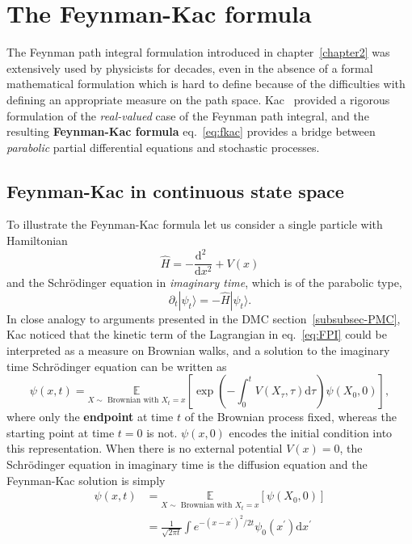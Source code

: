 \section{The Feynman-Kac formula}
\label{subsec:fk-fk}
The Feynman path integral formulation introduced in chapter~\ref{chapter2} was extensively used by physicists for decades, even in the absence of a formal mathematical formulation which is hard to define because of the difficulties with defining an appropriate measure on the path space. Kac~\cite{kac1949distributions} provided a rigorous formulation of the \textit{real-valued} case of the Feynman path integral, and the resulting \textbf{Feynman-Kac formula} eq.~\eqref{eq:fkac} provides a bridge between \emph{parabolic} partial differential equations and stochastic processes. 

\subsection{Feynman-Kac in continuous state space}
\label{subsec:FK_in_continuous_space}
To illustrate the Feynman-Kac formula let us consider a single particle with Hamiltonian
\begin{equation}
	\hat{H} = -\frac{\mathrm{d}^2~~}{\mathrm{d}x^2} + V(x)
\end{equation}
and the Schr\" odinger equation in \textit{imaginary time}, which is of the parabolic type, 
\begin{equation}
	\label{eq:imag_sch}
	\partial_t | \psi_t \rangle = - \hat{H} | \psi_t \rangle.
\end{equation}
In close analogy to arguments presented in the DMC section~\ref{subsubsec-PMC}, Kac noticed that the kinetic term of the Lagrangian in eq.~\eqref{eq:FPI} could be interpreted as a measure on Brownian walks, and a solution to the imaginary time Schr\" odinger equation can be written as
\begin{equation}
	\label{eq:fkac}
	\psi(x, t)=\underset{X \sim \text { Brownian with } X_{t}=x}{\mathbb{E}}
	\left[\exp \left(-\int_{0}^{t}  V\left(X_{\tau}, \tau \right) \mathrm{d}\tau \right) \psi\left(X_{0}, 0\right)\right],
\end{equation}
where only the \textbf{endpoint} at time $t$ of the Brownian process fixed, whereas the starting point at time $t=0$ is not. $\psi (x, 0)$ encodes the initial condition into this representation. When there is no external potential $V(x) = 0$, the Schr\" odinger equation in imaginary time is the diffusion equation and the Feynman-Kac solution is simply
\begin{equation}
	\begin{aligned} 
		\psi(x, t) &= \underset{X \sim \text { Brownian with } X_{t}=x}{\mathbb{E}}\left[\psi\left(X_{0}, 0\right)\right] \\
		&=  
		\frac{1}{\sqrt{2 \pi t}} \int  e^{-\left(x-x^{\prime}\right)^{2} / 2 t} \psi_{0}\left(x^{\prime}\right) \mathrm{d} x^{\prime}
	\end{aligned}
\end{equation}
